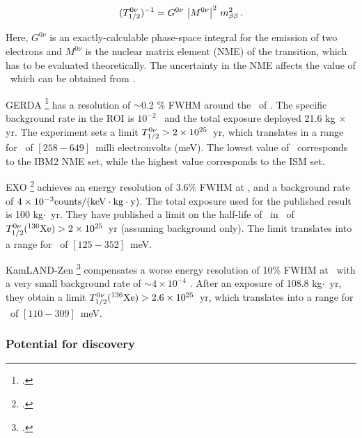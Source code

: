\begin{equation}
(T^{0\nu}_{1/2})^{-1} = G^{0\nu} \ \big|M^{0\nu}\big|^{2} \ \mbb^{2} \, .
\label{eq:Tonu}
\end{equation}

Here, $G^{0\nu}$ is an exactly-calculable phase-space integral for the emission of two electrons and $M^{0\nu}$ is the nuclear matrix element (NME) of the transition, which has to be evaluated theoretically. The uncertainty in the NME affects the value of \mbb\ which can be obtained from \Tonu.
 
GERDA \footcite{Agostini:2013mzu} has a resolution of $\sim$0.2 \% FWHM around the \Qbb\ of \GE. The specific background rate in the ROI is $10^{-2}$ \ckky\ and the total exposure deployed 21.6 kg $\times$ yr. The experiment sets a limit $T_{1/2}^{0\nu} > 2 \times 10^{25}$~yr, which translates  in a range for \mbb\ of $[258-649]$~milli electronvolts (meV). The lowest value of \mbb\ corresponds to the IBM2 NME set, while the highest value corresponds to the ISM set.

EXO \footcite{Albert:2014awa} achieves an energy resolution of 3.6\% FWHM at \Qbb, and a background rate of $ 4 \times 10^{-3}\rm counts/(keV \cdot kg \cdot y)$. The total exposure used for the published result is 100 kg$\cdot$~yr. They have published a limit on the half-life of \bbonu\ in \XE\ of $T_{1/2}^{0\nu}({}^{136}\rm Xe) > 2 \times 10^{25}$~yr (assuming background only). The limit translates into a range for \mbb\ of $[125-352]$~meV.

KamLAND-Zen \footcite{TheKamLAND-Zen:2014lma} compensates a worse energy resolution of 10\% FWHM at \Qbb\ with a very small background rate of $\sim 4 \times 10^{-4}$ \ckky. After an exposure of 108.8 kg$\cdot$~yr, they obtain a limit  $T_{1/2}^{0\nu}({}^{136}\rm Xe) > 2.6 \times 10^{25}$~yr, which translates into a range for \mbb\ of $[110-309]$~meV.

 \subsubsection*{Potential for discovery}
 
